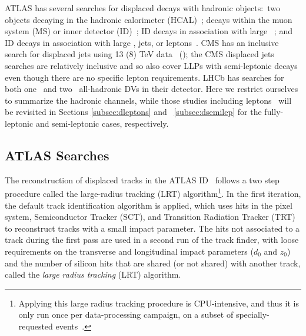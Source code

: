 ATLAS has several searches for displaced decays with hadronic objects:~two objects decaying in the hadronic calorimeter (HCAL)~\cite{ATLAS-CONF-2016-103,CalRatio8TeV}; decays within the muon system (MS) or inner detector (ID)~\cite{Aad:2015uaa}; ID decays in association with large \met ~\cite{Aaboud:2017iio}; and ID decays in association with large 
\met, jets, or leptons~\cite{Aad:2015rba}.  CMS has an inclusive search for displaced jets using 13 (8) TeV data~\cite{CMS:2017oor} (\cite{CMS:2014wda}); the CMS displaced jets searches are relatively inclusive and so also cover LLPs with semi-leptonic decays even though there are no specific lepton requirements. LHCb has searches for both one~\cite{Aaij:2017mic} and two~\cite{Aaij:2016isa} all-hadronic DVs in their detector. Here we restrict ourselves to summarize the hadronic channels, while those studies including leptons~\cite{Aad:2015rba,CMS:2017oor} will be revisited in Sections \ref{subsec:dleptons} and ~\ref{subsec:dsemilep} for the fully-leptonic and semi-leptonic cases, respectively.

\subsection{ATLAS Searches}

The reconstruction of displaced tracks in the ATLAS ID~\cite{ATL-PHYS-PUB-2017-014} follows a two step procedure called the large-radius tracking (LRT) algorithm\footnote{Applying this large radius tracking procedure is CPU-intensive, and thus it is only run once per data-processing campaign, on a subset of specially-requested events~\cite{ATL-PHYS-PUB-2017-014}.}. In the first iteration, the default track identification algorithm is applied, which uses hits in the pixel system, Semiconductor Tracker (SCT), and Transition Radiation Tracker (TRT) to reconstruct tracks with a small impact parameter.  The hits not associated to a track during the first pass are used in a second run of the track finder, with loose requirements on the transverse and longitudinal impact parameters ($d_{0}$ and $z_{0}$) and the number of silicon hits that are shared (or not shared) with another track, called the \emph{large radius tracking} (LRT) algorithm.

